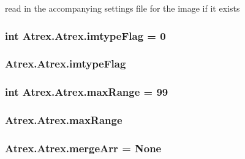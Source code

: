 read in the accompanying settings file for the image if it exists 

\hypertarget{class_atrex_1_1_atrex_aabc4d80436aab113d3ecabc4fb692c8e}{
\subsubsection[{imtype\-Flag}]{\setlength{\rightskip}{0pt plus 5cm}int Atrex.\-Atrex.\-imtype\-Flag = 0\hspace{0.3cm}{\ttfamily [static]}}}\label{class_atrex_1_1_atrex_aabc4d80436aab113d3ecabc4fb692c8e}
\hypertarget{class_atrex_1_1_atrex_ac181165f963c93be5b4a5e79ac9100e2}{
\subsubsection[{imtype\-Flag}]{\setlength{\rightskip}{0pt plus 5cm}Atrex.\-Atrex.\-imtype\-Flag}}\label{class_atrex_1_1_atrex_ac181165f963c93be5b4a5e79ac9100e2}
\hypertarget{class_atrex_1_1_atrex_ad050fe0947cfc2aaed121ca1f306d637}{
\subsubsection[{max\-Range}]{\setlength{\rightskip}{0pt plus 5cm}int Atrex.\-Atrex.\-max\-Range = 99\hspace{0.3cm}{\ttfamily [static]}}}\label{class_atrex_1_1_atrex_ad050fe0947cfc2aaed121ca1f306d637}
\hypertarget{class_atrex_1_1_atrex_a240f5adcbd64d4282c41fc884722d453}{
\subsubsection[{max\-Range}]{\setlength{\rightskip}{0pt plus 5cm}Atrex.\-Atrex.\-max\-Range}}\label{class_atrex_1_1_atrex_a240f5adcbd64d4282c41fc884722d453}
\hypertarget{class_atrex_1_1_atrex_ac11efcc7aecf0e1378a6ea2403695cd9}{
\subsubsection[{merge\-Arr}]{\setlength{\rightskip}{0pt plus 5cm}Atrex.\-Atrex.\-merge\-Arr = None\hspace{0.3cm}{\ttfamily [static]}}}\label{class_atrex_1_1_atrex_ac11efcc7aecf0e1378a6ea2403695cd9}
